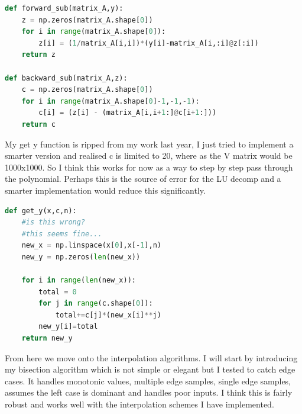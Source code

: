 \documentclass{article}
\begin{document}
\begin{lstlisting}[language=Python]
def forward_sub(matrix_A,y):
    z = np.zeros(matrix_A.shape[0])
    for i in range(matrix_A.shape[0]):
        z[i] = (1/matrix_A[i,i])*(y[i]-matrix_A[i,:i]@z[:i])
    return z

def backward_sub(matrix_A,z):
    c = np.zeros(matrix_A.shape[0])
    for i in range(matrix_A.shape[0]-1,-1,-1):
        c[i] = (z[i] - (matrix_A[i,i+1:]@c[i+1:]))
    return c
\end{lstlisting}

My get y function is ripped from my work last year, I just tried to implement a smarter version and realised c is limited to 20, where as the V matrix would be 1000x1000. So I think this works for now as a way to step by step pass through the polynomial. Perhaps this is the source of error for the LU decomp and a smarter implementation would reduce this significantly.

\begin{lstlisting}[language=Python]
def get_y(x,c,n):
    #is this wrong?
    #this seems fine...
    new_x = np.linspace(x[0],x[-1],n)
    new_y = np.zeros(len(new_x))

    for i in range(len(new_x)):
        total = 0
        for j in range(c.shape[0]):
            total+=c[j]*(new_x[i]**j)
        new_y[i]=total
    return new_y
\end{lstlisting}

From here we move onto the interpolation algorithms. I will start by introducing my bisection algorithm which is not simple or elegant but I tested to catch edge cases. It handles monotonic values, multiple edge samples, single edge samples, assumes the left case is dominant and handles poor inputs. I think this is fairly robust and works well with the interpolation schemes I have implemented.
\end{document}
